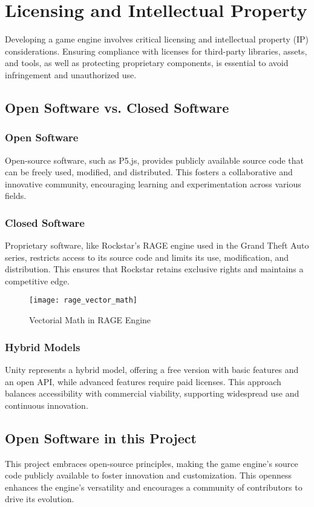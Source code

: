 \section*{Licensing and Intellectual Property}

Developing a game engine involves critical licensing and intellectual property (IP) considerations. Ensuring compliance with licenses for third-party libraries, assets, and tools, as well as protecting proprietary components, is essential to avoid infringement and unauthorized use.

\subsection*{Open Software vs. Closed Software}

\subsubsection*{Open Software}

Open-source software, such as P5.js, provides publicly available source code that can be freely used, modified, and distributed. This fosters a collaborative and innovative community, encouraging learning and experimentation across various fields.

\subsubsection*{Closed Software}

Proprietary software, like Rockstar's RAGE engine used in the Grand Theft Auto series, restricts access to its source code and limits its use, modification, and distribution. This ensures that Rockstar retains exclusive rights and maintains a competitive edge.

\begin{figure}[h]
    \centering
    \texttt{[image: rage\_vector\_math]}
    \caption{Vectorial Math in RAGE Engine}
\end{figure}

\subsubsection*{Hybrid Models}

Unity represents a hybrid model, offering a free version with basic features and an open API, while advanced features require paid licenses. This approach balances accessibility with commercial viability, supporting widespread use and continuous innovation.

\subsection*{Open Software in this Project}

This project embraces open-source principles, making the game engine's source code publicly available to foster innovation and customization. This openness enhances the engine's versatility and encourages a community of contributors to drive its evolution.

